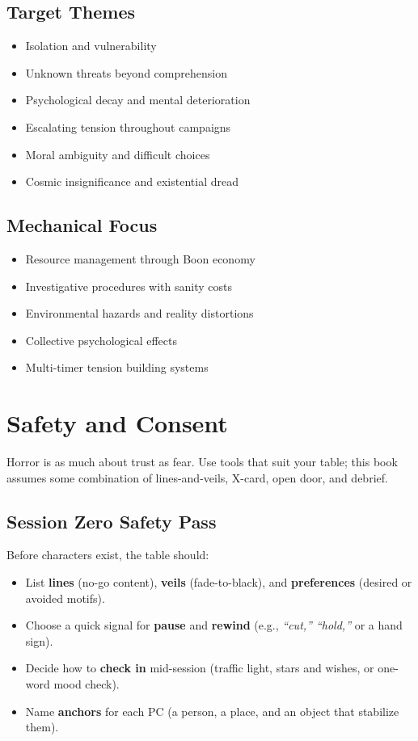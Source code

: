 \documentclass[11pt]{article}
\newcommand{\PC}{\textsc{PC}}
\begin{document}
\subsection{Target Themes}

\begin{itemize}
\item Isolation and vulnerability
\item Unknown threats beyond comprehension
\item Psychological decay and mental deterioration
\item Escalating tension throughout campaigns
\item Moral ambiguity and difficult choices
\item Cosmic insignificance and existential dread
\end{itemize}

\subsection{Mechanical Focus}

\begin{itemize}
\item Resource management through Boon economy
\item Investigative procedures with sanity costs
\item Environmental hazards and reality distortions
\item Collective psychological effects
\item Multi-timer tension building systems
\end{itemize}

\section{Safety and Consent}

Horror is as much about trust as fear. Use tools that suit your table; this book assumes some combination of lines-and-veils, X-card, open door, and debrief.

\subsection{Session Zero Safety Pass}

Before characters exist, the table should:
\begin{itemize}
  \item List \textbf{lines} (no-go content), \textbf{veils} (fade-to-black), and \textbf{preferences} (desired or avoided motifs).
  \item Choose a quick signal for \textbf{pause} and \textbf{rewind} (e.g., \emph{``cut,'' ``hold,''} or a hand sign).
  \item Decide how to \textbf{check in} mid-session (traffic light, stars and wishes, or one-word mood check).
  \item Name \textbf{anchors} for each \PC{} (a person, a place, and an object that stabilize them).
\end{itemize}
\end{document}
